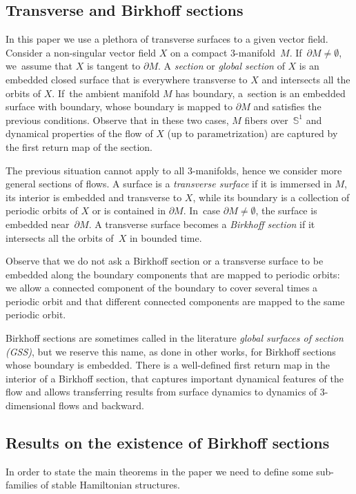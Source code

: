 \documentclass[JEP,XML,SOM,Unicode,NoEqCountersInSection,NoFloatCountersInSection,published]{cedram}
\newcommand{\threemanifold}{$3$\nobreakdash-mani\-fold\xspace}
\newcommand{\threemanifolds}{$3$\nobreakdash-mani\-folds\xspace}
\theoremstyle{definition}
\begin{document}
\subsection{Transverse and Birkhoff sections} In this paper we use a plethora of transverse surfaces to a given vector field. Consider a non-singular vector field $X$ on a compact \threemanifold~$M$. If~$\partial M\neq \emptyset$, we~assume that $X$ is tangent to $\partial M$. A \emph{section} or \emph{global section} of $X$ is an embedded closed surface that is everywhere transverse to $X$ and intersects all the orbits of $X$. If~the ambient manifold $M$ has boundary, a~section is an embedded surface with boundary, whose boundary is mapped to $\partial M$ and satisfies the previous conditions. Observe that in these two cases, $M$ fibers over~$\mathbb{S}^1$ and dynamical properties of the flow of $X$ (up to parametrization) are captured by the first return map of the section.

The previous situation cannot apply to all \threemanifolds, hence we consider more general sections of flows.
A surface is a \emph{transverse surface} if it is immersed in $M$, its interior is embedded and transverse to $X$, while its boundary is a collection of periodic orbits of $X$ or is contained in $\partial M$. In~case $\partial M\neq \emptyset$, the surface is embedded near~$\partial M$. A transverse surface becomes a \emph{Birkhoff section} if it intersects all the orbits of~$X$ in bounded time.

Observe that we do not ask a Birkhoff section or a transverse surface to be embedded along the boundary components that are mapped to periodic orbits: we allow a connected component of the boundary to cover several times a periodic orbit and that different connected components are mapped to the same periodic orbit.

Birkhoff sections are sometimes called in the literature \emph{global surfaces of section (GSS)}, but we reserve this name, as done in other works, for Birkhoff sections whose boundary is embedded. There is a well-defined first return map in the interior of a Birkhoff section, that captures important dynamical features of the flow and allows transferring results from surface dynamics to dynamics of 3-dimensional flows and backward.

\subsection{Results on the existence of Birkhoff sections} In order to state the main theorems in the paper we need to define some sub-families of stable Hamiltonian structures.
\end{document}
